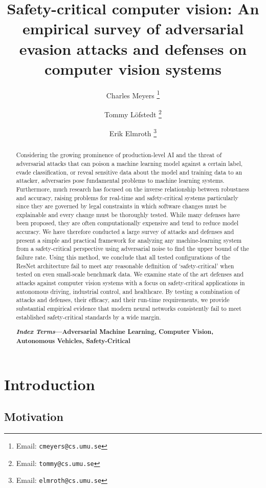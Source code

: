 \documentclass[lettersize,journal]{IEEEtran}
\title{Safety-critical computer vision: An empirical survey of adversarial evasion attacks and defenses on computer vision systems}
\author[1]{Charles Meyers%
  \thanks{Email: \texttt{cmeyers@cs.umu.se}}}
\author[1]{Tommy L\"{o}fstedt%
  \thanks{Email: \texttt{tommy@cs.umu.se}}}
\author[1]{Erik Elmroth%
  \thanks{Email: \texttt{elmroth@cs.umu.se}}}
\affil[1]{Department of Computing Science, Umeå University, Umeå, Sweden}
\begin{document}
\maketitle
\begin{abstract}


Considering the growing prominence of production-level AI and the threat of adversarial attacks that can poison a machine learning model against a certain label, evade classification, or reveal sensitive data about the model and training data to an attacker, adversaries pose fundamental problems to machine learning systems. Furthermore, much research has focused on the inverse relationship between robustness and accuracy, raising problems for real-time and safety-critical systems particularly since they are governed by legal constraints in which software changes must be explainable and every change must be thoroughly tested. While many defenses have been proposed, they are often computationally expensive and tend to reduce model accuracy. We have therefore conducted a large survey of attacks and defenses and present a simple and practical framework for analyzing any machine-learning system from a safety-critical perspective using adversarial noise to find the upper bound of the failure rate. Using this method, we conclude that all tested configurations of the ResNet architecture fail to meet any reasonable definition of `safety-critical' when tested on even small-scale benchmark data. We examine state of the art defenses and attacks against computer vision systems with a focus on safety-critical applications in autonomous driving, industrial control, and healthcare. By testing a combination of attacks and defenses, their efficacy, and their run-time requirements, we provide substantial empirical evidence that modern neural networks consistently fail to meet established safety-critical standards by a wide margin.

\textbf{\textit{Index Terms}---Adversarial Machine Learning, Computer Vision, Autonomous Vehicles, Safety-Critical}

\end{abstract}


\section{Introduction}

\subsection{Motivation}
\end{document}
